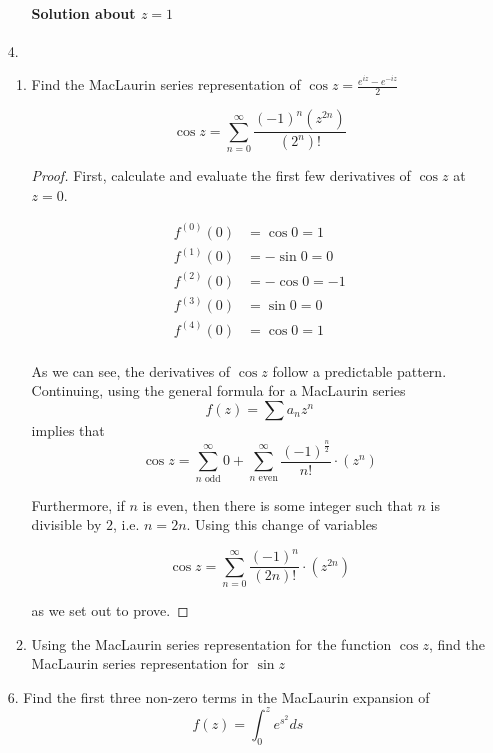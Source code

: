 \documentclass[11pt]{article}
\begin{document}
\begin{enumerate}
\begin{enumerate}
		\paragraph{Solution about $z = 1$} 
	\end{enumerate}
	
	\item[4.]
	\begin{enumerate}
		\item Find the MacLaurin series representation of $\cos{z} = \frac{e^{iz} - e^{-iz}}{2}$
		
		\bigskip
		
		\[\cos{z} = \sum^{\infty}_{n=0} \frac{(-1)^n (z^{2n})}{(2^n)!} \]
		
		\begin{proof}
			First, calculate and evaluate the first few derivatives of $\cos{z}$ at $z = 0$.
			
			\[\begin{aligned}
			f^{(0)}(0) &= \cos{0} = 1 \\
			f^{(1)}(0) &= -\sin{0} = 0 \\
			f^{(2)}(0) &= -\cos{0} = -1 \\
			f^{(3)}(0) &= \sin{0} = 0 \\
			f^{(4)}(0) &= \cos{0} = 1 \\
			\end{aligned}\]
			
			As we can see, the derivatives of $\cos{z}$ follow a predictable pattern. Continuing, using the general formula for a MacLaurin series
			\[f(z) = \sum a_n z^n\]
			implies that
			\[\cos{z} = \sum^{\infty}_{\text{$n$ odd}} 0 +
				\sum^{\infty}_{\text{$n$ even}} \frac{(-1)^{\frac{n}{2}}}{n!} \cdot (z^n) \]
				
			Furthermore, if $n$ is even, then there is some integer such that $n$ is divisible by $2$, i.e. $n = 2n$. Using this change of variables
			
			\[\cos{z} = \sum^{\infty}_{n=0} \frac{(-1)^n}{(2n)!} \cdot (z^{2n}) \]
			
			as we set out to prove.
		\end{proof}
		
		\item Using the MacLaurin series representation for the function $\cos{z}$, find the MacLaurin series representation for $\sin{z}$
	\end{enumerate}
	
	\item[6.] Find the first three non-zero terms in the MacLaurin expansion of
	\[f(z) = \int_0^{z} e^{s^2} ds\]
	

\end{enumerate}
\end{document}
